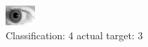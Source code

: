 \begin{figure}[h!]
\begin{center}
\includegraphics[width=0.60\columnwidth]{figures/ID290_class_4_target_3.png}
\end{center}
\caption{ Classification: 4 actual target: 3}
\label{fig:ID290_class_4_target_3}
\end{figure}
